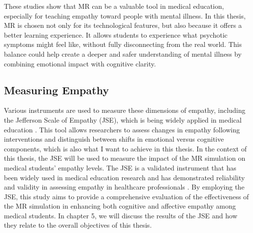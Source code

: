 These studies show that MR can be a valuable tool in medical education, especially for teaching empathy toward people with mental illness. In this thesis, MR is chosen not only for its technological features, but also because it offers a better learning experience. It allows students to experience what psychotic symptoms might feel like, without fully disconnecting from the real world. This balance could help create a deeper and safer understanding of mental illness by combining emotional impact with cognitive clarity.

\subsection{Measuring Empathy}
Various instruments are used to measure these dimensions of empathy, including the Jefferson Scale of Empathy (JSE), which is being widely applied in medical education \cite{Alieldin2024}. This tool allows researchers to assess changes in empathy following interventions and distinguish between shifts in emotional versus cognitive components, which is also what I want to achieve in this thesis. In the context of this thesis, the JSE will be used to measure the impact of the MR simulation on medical students' empathy levels. The JSE is a validated instrument that has been widely used in medical education research and has demonstrated reliability and validity in assessing empathy in healthcare professionals \cite{Hojat2002}. By employing the JSE, this study aims to provide a comprehensive evaluation of the effectiveness of the MR simulation in enhancing both cognitive and affective empathy among medical students. In chapter 5, we will discuss the results of the JSE and how they relate to the overall objectives of this thesis.

